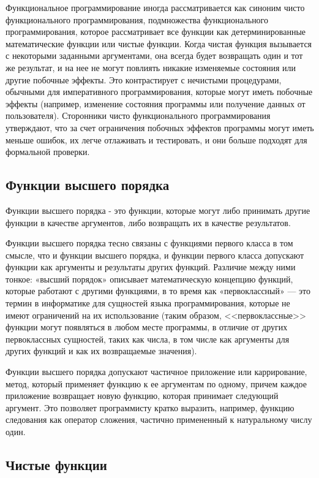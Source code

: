Функциональное программирование иногда рассматривается как синоним чисто функционального программирования, подмножества функционального программирования, которое рассматривает все функции как детерминированные математические функции или чистые функции. Когда чистая функция вызывается с некоторыми заданными аргументами, она всегда будет возвращать один и тот же результат, и на нее не могут повлиять никакие изменяемые состояния или другие побочные эффекты. Это контрастирует с нечистыми процедурами, обычными для императивного программирования, которые могут иметь побочные эффекты (например, изменение состояния программы или получение данных от пользователя). Сторонники чисто функционального программирования утверждают, что за счет ограничения побочных эффектов программы могут иметь меньше ошибок, их легче отлаживать и тестировать, и они больше подходят для формальной проверки. 

\subsection{Функции высшего порядка}\label{sec:ch1/sec3/subsec1}

Функции высшего порядка - это функции, которые могут либо принимать другие функции в качестве аргументов, либо возвращать их в качестве результатов.

Функции высшего порядка тесно связаны с функциями первого класса в том смысле, что и функции высшего порядка, и функции первого класса допускают функции как аргументы и результаты других функций. Различие между ними тонкое: «высший порядок» описывает математическую концепцию функций, которые работают с другими функциями, в то время как «первоклассный» --- это термин в информатике для сущностей языка программирования, которые не имеют ограничений на их использование (таким образом, <<первоклассные>> функции могут появляться в любом месте программы, в отличие от других первоклассных сущностей, таких как числа, в том числе как аргументы для других функций и как их возвращаемые значения).

Функции высшего порядка допускают частичное приложение или каррирование, метод, который применяет функцию к ее аргументам по одному, причем каждое приложение возвращает новую функцию, которая принимает следующий аргумент. Это позволяет программисту кратко выразить, например, функцию следования как оператор сложения, частично примененный к натуральному числу один. 

\subsection{Чистые функции}\label{sec:ch1/sec3/subsec2}

